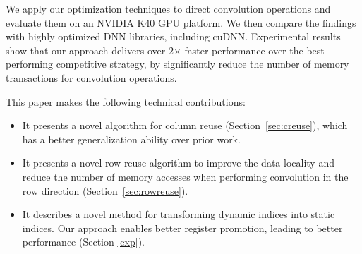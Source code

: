 
We apply our optimization techniques to direct convolution operations and evaluate them on an NVIDIA K40 GPU platform.
We then compare the findings with highly optimized DNN libraries, including cuDNN. Experimental results show that our approach delivers
over 2$\times$ faster performance over the best-performing competitive strategy, by significantly reduce the number of
memory transactions for convolution operations.

This paper makes the following technical contributions:
\begin{itemize}
  \item It presents a novel algorithm for column reuse (Section~\ref{sec:creuse}), which has a better generalization
      ability over prior work.
  \item It presents a novel row reuse algorithm to improve the data locality and reduce the number of memory accesses
      when performing convolution in the row direction (Section~\ref {sec:rowreuse}).
  \item It describes a novel method for transforming dynamic indices into static indices. Our approach enables better
      register promotion, leading to better performance (Section \ref{exp}).
\end{itemize}
